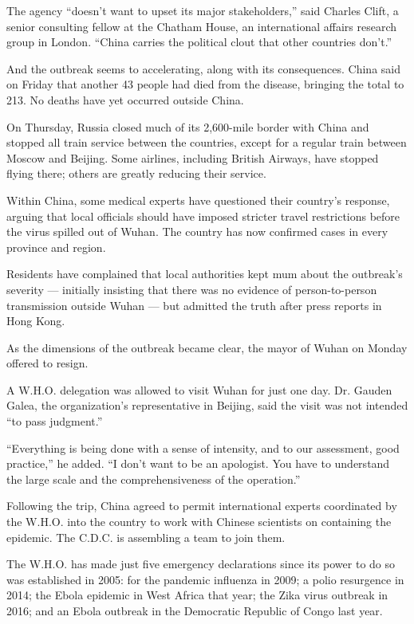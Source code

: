 The agency ``doesn't want to upset its major stakeholders,'' said
Charles Clift, a senior consulting fellow at the Chatham House, an
international affairs research group in London. ``China carries the
political clout that other countries don't.''

And the outbreak seems to accelerating, along with its consequences.
China said on Friday that another 43 people had died from the disease,
bringing the total to 213. No deaths have yet occurred outside China.

On Thursday, Russia closed much of its 2,600-mile border with China and
stopped all train service between the countries, except for a regular
train between Moscow and Beijing. Some airlines, including British
Airways, have stopped flying there; others are greatly reducing their
service.

Within China, some medical experts have questioned their country's
response, arguing that local officials should have imposed stricter
travel restrictions before the virus spilled out of Wuhan. The country
has now confirmed cases in every province and region.

Residents have complained that local authorities kept mum about the
outbreak's severity --- initially insisting that there was no evidence
of person-to-person transmission outside Wuhan --- but admitted the
truth after press reports in Hong Kong.

As the dimensions of the outbreak became clear, the mayor of Wuhan on
Monday offered to resign.

A W.H.O. delegation was allowed to visit Wuhan for just one day. Dr.
Gauden Galea, the organization's representative in Beijing, said the
visit was not intended ``to pass judgment.''

``Everything is being done with a sense of intensity, and to our
assessment, good practice,'' he added. ``I don't want to be an
apologist. You have to understand the large scale and the
comprehensiveness of the operation.''

Following the trip, China agreed to permit international experts
coordinated by the W.H.O. into the country to work with Chinese
scientists on containing the epidemic. The C.D.C. is assembling a team
to join them.

The W.H.O. has made just five emergency declarations since its power to
do so was established in 2005: for the pandemic influenza in 2009; a
polio resurgence in 2014; the Ebola epidemic in West Africa that year;
the Zika virus outbreak in 2016; and an Ebola outbreak in the Democratic
Republic of Congo last year.

